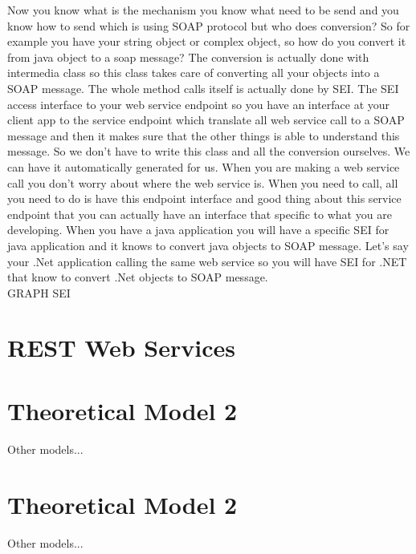 Now you know what is the mechanism you know what need to be send and you know how to send which is using SOAP protocol
but who does conversion? So for example you have your string object or complex object, so how do you convert it from java
object to a soap message? The conversion is actually done with intermedia class so this class takes care of converting all
your objects into a SOAP message. The whole method calls itself is actually done by SEI. The SEI access interface to your
web service endpoint so you have an interface at your client app to the service endpoint which translate all web service
call to a SOAP message and then it makes sure that the other things is able to understand this message. So we don’t have to
write this class and all the conversion ourselves. We can have it automatically generated for us. When you are making a web
service call you don’t worry about where the web service is. When you need to call, all you need to do is have this endpoint
interface and good thing about this service endpoint that you can actually have an interface that specific to what you are
developing. When you have a java application you will have a specific SEI for java application and it knows to convert java
objects to SOAP message. Let’s say your .Net application calling the same web service so you will have SEI for .NET that know
to convert .Net objects to SOAP message.\\

GRAPH SEI\\
\section{REST Web Services}
\label{section:rest}

\section{Theoretical Model 2}
\label{section:theory2}

Other models...

\section{Theoretical Model 2}
\label{section:theory2}

Other models...

